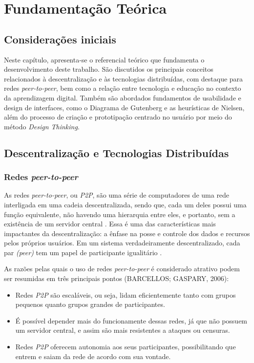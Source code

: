\chapter[Fundamentação Teórica]{Fundamentação Teórica}
\label{cap:fundamentacao}

\section{Considerações iniciais}
Neste capítulo, apresenta-se o referencial teórico que fundamenta o desenvolvimento deste trabalho. São discutidos os principais conceitos relacionados à descentralização e às tecnologias distribuídas, com destaque para redes \textit{peer-to-peer}, bem como a relação entre tecnologia e educação no contexto da aprendizagem digital. Também são abordados fundamentos de usabilidade e design de interfaces, como o Diagrama de Gutenberg e as heurísticas de Nielsen, além do processo de criação e prototipação centrado no usuário por meio do método \textit{Design Thinking}.

\section{Descentralização e Tecnologias Distribuídas}
\subsection{Redes \textit{peer-to-peer}}
As redes \textit{peer-to-peer}, ou \textit{P2P}, são uma série de computadores de uma rede interligada em uma cadeia descentralizada, sendo que, cada um deles possui uma função equivalente, não havendo uma hierarquia entre eles, e portanto, sem a existência de um servidor central \cite{otton2007}. Essa é uma das características mais impactantes da descentralização: a ênfase na posse e controle dos dados e recursos pelos próprios usuários. Em um sistema verdadeiramente descentralizado, cada par \textit{(peer)} tem um papel de participante igualitário \cite{oram2002}.

As razões pelas quais o uso de redes \textit{peer-to-peer} é considerado atrativo podem ser resumidas em três principais pontos (BARCELLOS; GASPARY, 2006): 

\begin{itemize}
    \item Redes \textit{P2P} são escaláveis, ou seja, lidam eficientemente tanto com grupos pequenos quanto grupos grandes de participantes. 
    \item É possível depender mais do funcionamente dessas redes, já que não possuem um servidor central, e assim são mais resistentes a ataques ou censuras.
    \item Redes \textit{P2P} oferecem autonomia aos seus participantes, possibilitando que entrem e saiam da rede de acordo com sua vontade. 
\end{itemize}

